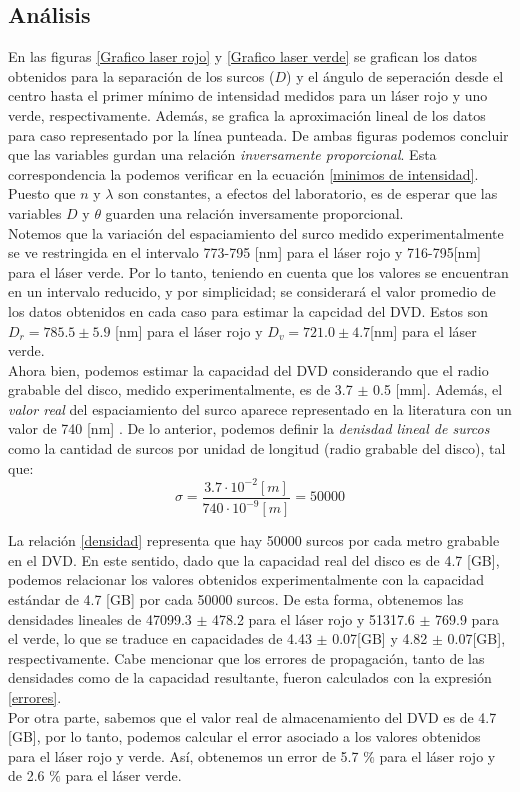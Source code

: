 \documentclass[10pt,a4paper]{article}
\begin{document}
	\begin{multicols}{2}
	\section{Análisis}
	En las figuras \ref{Grafico laser rojo} y \ref{Grafico laser verde} se grafican los datos obtenidos para la separación de los surcos ($D$) y el ángulo de seperación desde el centro hasta el primer mínimo de intensidad  medidos para un láser rojo y uno verde, respectivamente. Además, se grafica la aproximación lineal de los datos para caso representado por la línea punteada. De ambas figuras podemos concluir que las variables gurdan una relación \emph{inversamente proporcional}. Esta correspondencia la podemos verificar en la ecuación \ref{minimos de intensidad}. Puesto que $n$ y $\lambda$ son constantes, a efectos del laboratorio, es de esperar que las variables $D$ y $\theta$ guarden una relación inversamente proporcional.\\
	
	 Notemos que la variación del espaciamiento del surco medido experimentalmente se ve restringida en el intervalo 773-795 [nm] para el láser rojo y 716-795[nm] para el láser verde. Por lo tanto, teniendo en cuenta que los valores se encuentran en un intervalo reducido, y por simplicidad; se considerará el valor promedio de los datos obtenidos en cada caso para estimar la capcidad del DVD. Estos son $D_r =785.5 \pm 5.9$ [nm] para el láser rojo y $D_v = 721.0 \pm  4.7$[nm] para el láser verde.\\
	 
	 Ahora bien, podemos estimar la capacidad del DVD considerando que el radio grabable del disco, medido experimentalmente, es de 3.7 $\pm$ 0.5 [mm]. Además, el \emph{valor real} del espaciamiento del surco aparece representado en la literatura con un valor de 740 [nm] \cite{wikiCD}. De lo anterior, podemos definir la \emph{denisdad lineal de surcos} como la cantidad de surcos por unidad de longitud (radio grabable del disco), tal que:
	 \begin{equation}\label{densidad}
	 \sigma = \frac{3.7\cdot 10^{-2} [m]}{740 \cdot 10^{-9} [m]} = 50000 
	 \end{equation}
	 
	 La relación \ref{densidad} representa que hay 50000 surcos por cada metro grabable en el DVD. En este sentido, dado que la capacidad real del disco es de 4.7 [GB], podemos relacionar los valores obtenidos experimentalmente con la capacidad estándar de 4.7 [GB] por cada 50000 surcos. De esta forma, obtenemos las densidades lineales de 47099.3 $\pm$ 478.2 para el láser rojo y 51317.6 $\pm$ 769.9 para el verde, lo que se traduce en capacidades de 4.43 $\pm$ 0.07[GB] y 4.82 $\pm$ 0.07[GB], respectivamente. Cabe mencionar que los errores de propagación, tanto de las densidades como de la capacidad resultante, fueron calculados con la expresión \ref{errores}. \\
	Por otra parte, sabemos que el valor real de almacenamiento del DVD es de 4.7 [GB], por lo tanto, podemos calcular el error asociado a los valores obtenidos para el láser rojo y verde. Así, obtenemos un error de 5.7 $\%$ para el láser rojo y de 2.6 $\%$ para el láser verde.
	

\end{multicols}
\end{document}
